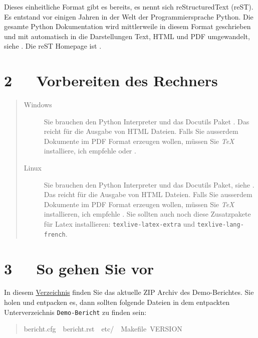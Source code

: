 \documentclass[a4paper,ngerman]{article}
\begin{document}
Dieses einheitliche Format gibt es bereits, es nennt sich \textquotedbl{}reStructuredText\textquotedbl{}
(reST).  Es entstand vor einigen Jahren in der Welt der Programmiersprache
Python. Die gesamte Python Dokumentation wird mittlerweile in diesem Format
geschrieben und mit \cite{SPHINX} automatisch in die Darstellungen Text, HTML und
PDF umgewandelt, siehe \cite{PYDOC}. Die reST Homepage ist \cite{REST}.


\section{2~~~Vorbereiten des Rechners%
  \label{vorbereiten-des-rechners}%
}
%
\begin{quote}
%
\begin{description}
\item[{Windows}] \leavevmode 
Sie brauchen den Python Interpreter \cite{PYTHON} und das Docutils Paket
\cite{DOCUTILS}.  Das reicht für die Ausgabe von HTML Dateien. Falls Sie
ausserdem Dokumente im PDF Format erzeugen wollen, müssen Sie \emph{TeX}
installiere, ich empfehle \cite{MIKTEX} oder \cite{TEXLIVE}.

\item[{Linux}] \leavevmode 
Sie brauchen den Python Interpreter \cite{PYTHON} und das Docutils Paket,
siehe \cite{DOCUTILS}.  Das reicht für die Ausgabe von HTML Dateien. Falls Sie
ausserdem Dokumente im PDF Format erzeugen wollen, müssen Sie \emph{TeX}
installieren, ich empfehle \cite{TEXLIVE}. Sie sollten auch noch diese
Zusatzpakete für Latex installieren: \texttt{texlive-latex-extra} und
\texttt{texlive-lang-french}.

\end{description}

\end{quote}


\section{3~~~So gehen Sie vor%
  \label{so-gehen-sie-vor}%
}

In diesem \href{http://elk.informatik.fh-augsburg.de/pub/Demo-Bericht/}{Verzeichnis} finden Sie das
aktuelle ZIP Archiv des Demo-Berichtes.  Sie holen und entpacken es, dann
sollten folgende Dateien in dem entpackten Unterverzeichnis \texttt{Demo-Bericht}
zu finden sein:
%
\begin{quote}{\ttfamily \raggedright \noindent
bericht.cfg~~bericht.rst~~etc/~~Makefile~VERSION
}
\end{quote}
\end{document}
